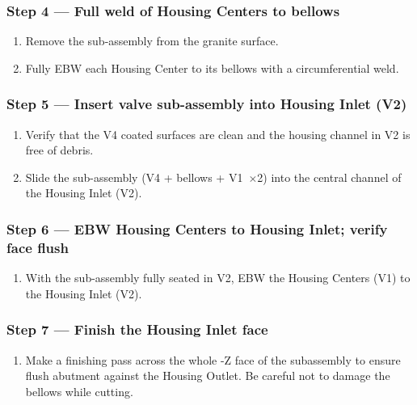 \documentclass[12pt, letterpaper]{report}%
\newcounter{mycounter}           %
\newcounter{sub}[mycounter]      %
\begin{document}
\begin{appendices}
	\subsubsection{Step 4 --- Full weld of Housing Centers to bellows}

	\begin{enumerate}[itemsep=4pt]
		\item Remove the sub-assembly from the granite surface.
		\item Fully EBW each Housing Center to its bellows with a circumferential weld.
	\end{enumerate}

	\subsubsection{Step 5 --- Insert valve sub-assembly into Housing Inlet (V2)}

	\begin{enumerate}[itemsep=4pt]
		\item Verify that the V4 coated surfaces are clean and the housing channel in V2 is
					free of debris.
		\item Slide the sub-assembly (V4 + bellows + V1~$\times$2) into the central
					channel of the Housing Inlet (V2).
	\end{enumerate}

	\subsubsection{Step 6 --- EBW Housing Centers to Housing Inlet; verify face flush}

	\begin{enumerate}[itemsep=4pt]
		\item With the sub-assembly fully seated in V2, EBW the Housing Centers (V1) to
					the Housing Inlet (V2).
	\end{enumerate}

	\subsubsection{Step 7 --- Finish the Housing Inlet face}

	\begin{enumerate}[itemsep=4pt]
		\item Make a finishing pass across the whole -Z face of the subassembly to
					ensure flush abutment against the Housing Outlet.
					Be careful not to damage the bellows while cutting.
	\end{enumerate}


\end{appendices}
\end{document}
